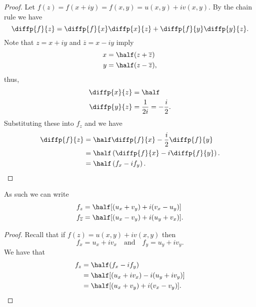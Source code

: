 \documentclass[12pt, a4paper]{article}
\begin{document}
\begin{proof}
    Let \(f(z) = f(x+iy) = f(x,y) =u(x,y)+iv(x,y)\). By the chain rule we have
    \[\diffp{f}{z} = \diffp{f}{x} \diffp{x}{z} + \diffp{f}{y} \diffp{y}{z}.\]
    Note that \(z = x+iy\) and \(\overline{z} = x-iy\) imply 
    \[\begin{aligned}
        x &= \half (z + \overline{z}) \\
        y &= \half (z - \overline{z}),
    \end{aligned}\]
    thus, 
    \[\begin{aligned}
        \diffp{x}{z} &= \half \\
        \diffp{y}{z} &= \frac{1}{2i} = - \frac{i}{2}.
    \end{aligned}\]
    Substituting these into \(f_z\) and we have 
    \[\begin{aligned}
        \diffp{f}{z} &= \half \diffp{f}{x} - \frac{i}{2} \diffp{f}{y} \\
        &= \half \left( \diffp{f}{x} - i \diffp{f}{y} \right). \\
        &= \half \left( f_x -i f_y \right).
    \end{aligned}\]
\end{proof}

\begin{theorem}
    As such we can write
    \[\begin{aligned}
        f_z &= \half [(u_x+v_y)+i(v_x-u_y)] \\
        f_{\overline{z}} &= \half [(u_x-v_y)+i(u_y+v_x)].
    \end{aligned}\]
\end{theorem}

\begin{proof}
    Recall that if \(f(z) = u(x,y)+iv(x,y)\) then 
    \[f_x = u_x +iv_x \quad \text{and} \quad f_y = u_y +iv_y.\]
    We have that 
    \[\begin{aligned}
        f_z &= \half (f_x -i f_y) \\
        &= \half [(u_x +iv_x)  - i (u_y +iv_y)] \\
        &= \half [(u_x + v_y)+i(v_x-v_y)].
    \end{aligned}\]
\end{proof}
\end{document}
